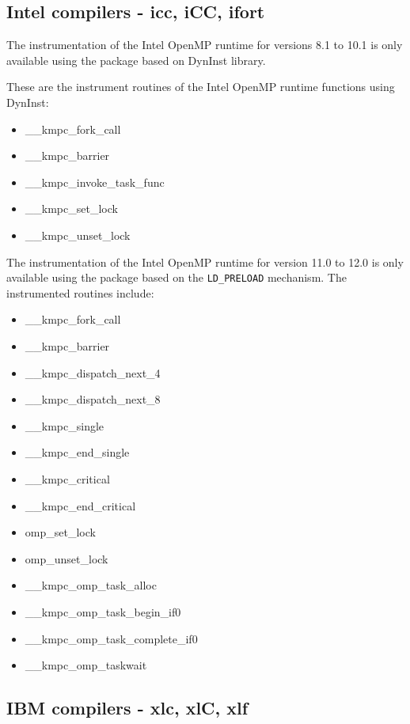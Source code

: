 \subsection{Intel compilers - icc, iCC, ifort}

The instrumentation of the Intel OpenMP runtime for versions 8.1 to 10.1 is only available using the \TRACE package based on DynInst library.

These are the instrument routines of the Intel OpenMP runtime functions using DynInst:

\begin{itemize}
\item \_\_kmpc\_fork\_call
\item \_\_kmpc\_barrier
\item \_\_kmpc\_invoke\_task\_func
\item \_\_kmpc\_set\_lock\footnotemark[4]
\item \_\_kmpc\_unset\_lock\footnotemark[4]
\end{itemize}

The instrumentation of the Intel OpenMP runtime for version 11.0 to 12.0 is only available using the \TRACE package based on the {\tt LD\_PRELOAD} mechanism. The instrumented routines include:

\begin{itemize}
\item \_\_kmpc\_fork\_call
\item \_\_kmpc\_barrier
\item \_\_kmpc\_dispatch\_next\_4
\item \_\_kmpc\_dispatch\_next\_8
\item \_\_kmpc\_single
\item \_\_kmpc\_end\_single
\item \_\_kmpc\_critical\footnotemark[4]
\item \_\_kmpc\_end\_critical\footnotemark[4]
\item omp\_set\_lock\footnotemark[4]
\item omp\_unset\_lock\footnotemark[4]
\item \_\_kmpc\_omp\_task\_alloc
\item \_\_kmpc\_omp\_task\_begin\_if0
\item \_\_kmpc\_omp\_task\_complete\_if0
\item \_\_kmpc\_omp\_taskwait
\end{itemize}

\subsection{IBM compilers - xlc, xlC, xlf}

